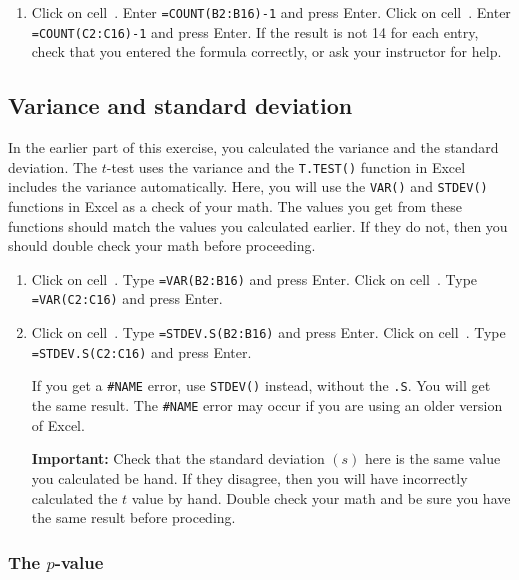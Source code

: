 \documentclass[12pt]{exam}
\newcommand*\xcell[1]{cell~\liningnum{#1}}
\begin{document}
\begin{enumerate}[resume]

	\item \label{df_calc} Click on \xcell{B18}. Enter \texttt{=COUNT(B2:B16)-1} and press Enter. Click on \xcell{C18}. Enter \texttt{=COUNT(C2:C16)-1} and press Enter. If the result is not 14 for each entry, check that you entered the formula correctly, or ask your instructor for help.
	
\end{enumerate}

\subsection*{Variance and standard deviation}

In the earlier part of this exercise, you calculated the variance and the standard deviation. The $t$-test uses the variance and the \texttt{T.TEST()} function in Excel includes the variance automatically. Here, you will use the \texttt{VAR()} and \texttt{STDEV()} functions in Excel as a check of your math. The values you get from these functions should match the values you calculated earlier.  If they do not, then you should double check your math before proceeding.

\begin{enumerate}[resume]

	\item Click on \xcell{B19}. Type \texttt{=VAR(B2:B16)} and press Enter. Click on \xcell{C19}. Type \texttt{=VAR(C2:C16)} and press Enter. 

	\item Click on \xcell{B20}. Type \texttt{=STDEV.S(B2:B16)} and press Enter. Click on \xcell{C20}. Type \texttt{=STDEV.S(C2:C16)} and press Enter. 
	
		If you get a \texttt{\#NAME} error, use \texttt{STDEV()} instead, without the \texttt{.S}. You will get the same result. The \texttt{\#NAME} error may occur if you are using an older version of Excel. 
		
		\textbf{Important:} Check that the standard deviation $\left(s\right)$ here is the same value you calculated be hand. If they disagree, then you will have incorrectly calculated the $t$ value by hand. Double check your math and be sure you have the same result before proceding.
	
\end{enumerate}

\subsubsection*{The $p$-value}
\end{document}
